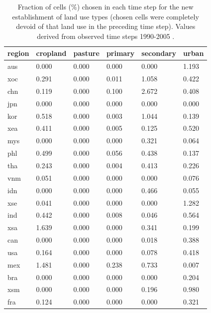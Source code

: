 \begin{table}[htb]
\centering
\caption{Fraction of cells ($\%$) chosen in each time step for the new establishment of land use types (chosen cells were completely devoid of that land use in the preceding time step). Values derived from observed time steps 1990-2005 \citep{hurtt_harmonization_2011}.}
\label{apx:ch4:tab_newest}
\begin{tabularx}{0.55\textwidth}{lllllY}
\toprule
region & cropland & pasture & primary & secondary & urban \\
\bottomrule
aus    & 0.000    & 0.000   & 0.000   & 0.000     & 1.193 \\
xoc    & 0.291    & 0.000   & 0.011   & 1.058     & 0.422 \\
chn    & 0.119    & 0.000   & 0.100   & 2.672     & 0.408 \\
jpn    & 0.000    & 0.000   & 0.000   & 0.000     & 0.000 \\
kor    & 0.518    & 0.000   & 0.003   & 1.044     & 0.139 \\
xea    & 0.411    & 0.000   & 0.005   & 0.125     & 0.520 \\
mys    & 0.000    & 0.000   & 0.000   & 0.321     & 0.064 \\
phl    & 0.499    & 0.000   & 0.056   & 0.438     & 0.137 \\
tha    & 0.243    & 0.000   & 0.004   & 0.413     & 0.226 \\
vnm    & 0.051    & 0.000   & 0.000   & 0.000     & 0.076 \\
idn    & 0.000    & 0.000   & 0.000   & 0.466     & 0.055 \\
xse    & 0.041    & 0.000   & 0.000   & 0.000     & 1.282 \\
ind    & 0.442    & 0.000   & 0.008   & 0.046     & 0.564 \\
xsa    & 1.639    & 0.000   & 0.000   & 0.341     & 0.199 \\
can    & 0.000    & 0.000   & 0.000   & 0.018     & 0.388 \\
usa    & 0.164    & 0.000   & 0.000   & 0.078     & 0.418 \\
mex    & 1.481    & 0.000   & 0.238   & 0.733     & 0.007 \\
bra    & 0.000    & 0.000   & 0.000   & 0.000     & 0.204 \\
xsm    & 0.000    & 0.000   & 0.000   & 0.196     & 0.980 \\
fra    & 0.124    & 0.000   & 0.000   & 0.000     & 0.321 \\

\end{tabularx}
\end{table}
